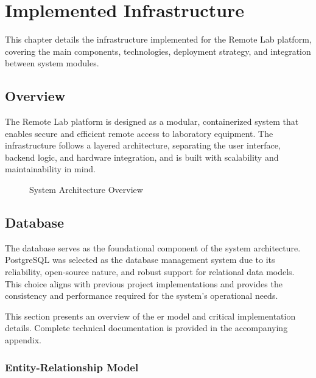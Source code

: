 %
%
\chapter{Implemented Infrastructure} \label{cap:implemented-infrastructure}

This chapter details the infrastructure implemented for the Remote Lab platform, covering the main components, technologies, deployment strategy, and integration between system modules.

\section{Overview}

The Remote Lab platform is designed as a modular, containerized system that enables secure and efficient remote access to laboratory equipment. The infrastructure follows a layered architecture, separating the user interface, backend logic, and hardware integration, and is built with scalability and maintainability in mind.

\begin{figure}[H]
    \centering
    
    \caption{System Architecture Overview}
    \label{fig:system-architecture}
\end{figure}





\section{Database}
The database serves as the foundational component of the system architecture. PostgreSQL was selected as the database management system due to its reliability, open-source nature, and robust support for relational data models. This choice aligns with previous project implementations and provides the consistency and performance required for the system's operational needs.

This section presents an overview of the \ac{er model} and critical implementation details. Complete technical documentation is provided in the accompanying appendix.

\subsection{Entity-Relationship Model}

